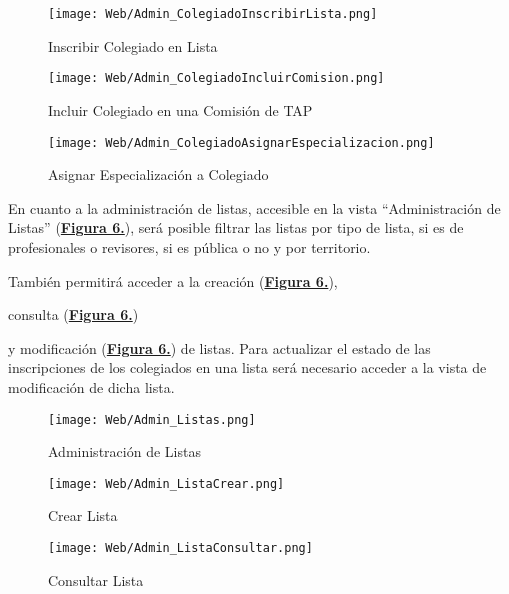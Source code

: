 \begin{figure}[!htbp]
  \centering
  \texttt{[image: Web/Admin\_ColegiadoInscribirLista.png]}
  \caption{Inscribir Colegiado en Lista}
  \label{fig:Web_Admin_ColegiadoInscribirLista}
\end{figure}
\FloatBarrier

\begin{figure}[!htbp]
  \centering
  \texttt{[image: Web/Admin\_ColegiadoIncluirComision.png]}
  \caption{Incluir Colegiado en una Comisión de TAP}
  \label{fig:Web_Admin_ColegiadoIncluirComision}
\end{figure}
\FloatBarrier

\begin{figure}[!htbp]
  \centering
  \texttt{[image: Web/Admin\_ColegiadoAsignarEspecializacion.png]}
  \caption{Asignar Especialización a Colegiado}
  \label{fig:Web_Admin_ColegiadoAsignarEspecializacion}
\end{figure}
\FloatBarrier

\addtocounter{figura_manual}{1} En cuanto a la administración de listas, accesible en la vista ``Administración de Listas'' (\textbf{\hyperref[fig:Web_Admin_Listas]{Figura 6.}}), será posible filtrar las listas por tipo de lista, si es de profesionales o revisores, si es pública o no y por territorio.\addtocounter{figura_manual}{1}  También permitirá acceder a la creación (\textbf{\hyperref[fig:Web_Admin_ListaCrear]{Figura 6.}}),\addtocounter{figura_manual}{1}  consulta (\textbf{\hyperref[fig:Web_Admin_ListaConsultar]{Figura 6.}})\addtocounter{figura_manual}{1}  y modificación (\textbf{\hyperref[fig:Web_Admin_ListaModificar]{Figura 6.}}) de listas. Para actualizar el estado de las inscripciones de los colegiados en una lista será necesario acceder a la vista de modificación de dicha lista.
\begin{figure}[!htbp]
  \centering
  \texttt{[image: Web/Admin\_Listas.png]}
  \caption{Administración de Listas}
  \label{fig:Web_Admin_Listas}
\end{figure}
\FloatBarrier

\begin{figure}[!htbp]
  \centering
  \texttt{[image: Web/Admin\_ListaCrear.png]}
  \caption{Crear Lista}
  \label{fig:Web_Admin_ListaCrear}
\end{figure}
\FloatBarrier

\begin{figure}[!htbp]
  \centering
  \texttt{[image: Web/Admin\_ListaConsultar.png]}
  \caption{Consultar Lista}
  \label{fig:Web_Admin_ListaConsultar}
\end{figure}
\FloatBarrier


